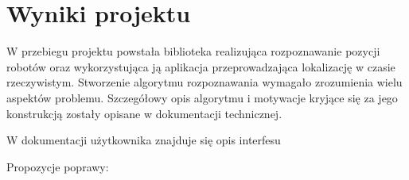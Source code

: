 \documentclass[polish,12pt]{aghthesis}
\begin{document}
\section{Wyniki projektu}

\label{sec:wyniki-projektu}
% 

W przebiegu projektu powstała biblioteka realizująca 
rozpoznawanie pozycji robotów oraz wykorzystująca ją aplikacja przeprowadzająca
lokalizację w czasie rzeczywistym. Stworzenie algorytmu rozpoznawania wymagało
zrozumienia wielu aspektów problemu. Szczegółowy opis algorytmu i motywacje 
kryjące się za jego konstrukcją zostały opisane w dokumentacji technicznej. 

W dokumentacji użytkownika znajduje się opis interfesu 

Propozycje poprawy:





\end{document}
